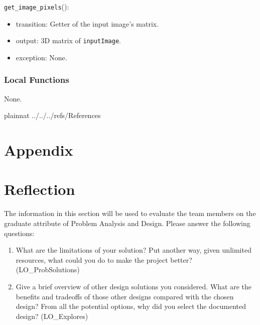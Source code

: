 \documentclass[12pt, titlepage]{article}
\def\code#1{\texttt{#1}}
\begin{document}
\noindent \code{get\_image\_pixels}():
\begin{itemize}
  \item transition: Getter of the input image's matrix.
  \item output: 3D matrix of \code{inputImage}.
  \item exception: None.
\end{itemize}


\subsubsection{Local Functions}
None.



\newpage

 {plainnat}
 {../../../refs/References}

\newpage

\section{Appendix} \label{Appendix}


\section{Reflection}

The information in this section will be used to evaluate the team members on the
graduate attribute of Problem Analysis and Design.  Please answer the following questions:

\begin{enumerate}
  \item What are the limitations of your solution?  Put another way, given
  unlimited resources, what could you do to make the project better? (LO\_ProbSolutions)
  \item Give a brief overview of other design solutions you considered.  What
  are the benefits and tradeoffs of those other designs compared with the chosen
  design?  From all the potential options, why did you select the documented design?
  (LO\_Explores)
\end{enumerate}
\end{document}
